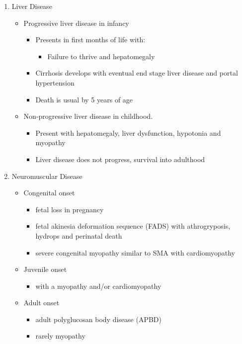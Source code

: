 \documentclass{scrartcl}
\begin{document}
\begin{enumerate}
\item Liver Disease
\label{sec:org294c6fb}
\begin{itemize}
\item Progressive liver disease in infancy
\begin{itemize}
\item Presents in first months of life with:
\begin{itemize}
\item Failure to thrive and hepatomegaly
\end{itemize}
\item Cirrhosis develops with eventual end stage liver disease and
portal hypertension
\item Death is usual by 5 years of age
\end{itemize}
\item Non-progressive liver disease in childhood.
\begin{itemize}
\item Present with hepatomegaly, liver dysfunction, hypotonia and
myopathy
\item Liver disease does not progress, survival into adulthood
\end{itemize}
\end{itemize}

\item Neuromuscular Disease
\label{sec:org7b11d68}
\begin{itemize}
\item Congenital onset
\begin{itemize}
\item fetal loss in pregnancy
\item fetal akinesia deformation sequence (FADS) with athrogryposis, hydrops and perinatal death
\item severe congenital myopathy similar to SMA with \textpm{} cardiomyopathy
\end{itemize}
\item Juvenile onset
\begin{itemize}
\item with a myopathy and/or cardiomyopathy
\end{itemize}
\item Adult onset
\begin{itemize}
\item adult polyglucosan body disease (APBD)
\item rarely myopathy
\end{itemize}
\end{itemize}
\end{enumerate}
\end{document}
